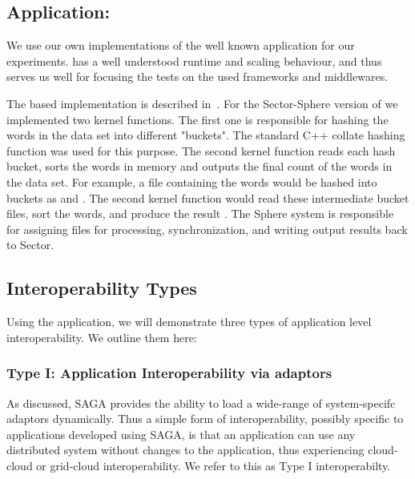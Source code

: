 \documentclass[3p,twocolumn]{elsarticle}
\begin{document}
\subsection{Application: \Wc}
\label{ssec:app}

We use our own implementations of the well known \wc application for
our experiments.  \Wc has a well understood runtime and scaling
behaviour, and thus serves us well for focusing the tests on the used
frameworks and middlewares.

The \mr based \wc implementation is described in~\cite{saga_ccgrid09}.
For the Sector-Sphere version of \wc we implemented two kernel
functions. The first one is responsible for hashing the
words in the data set into different "buckets". The standard C++ 
collate hashing function was used for this purpose.  The second 
kernel function reads each hash bucket, sorts the words in memory 
and outputs the final count of the words in the data set.  For example, 
a file containing the words
 would be hashed into buckets as
 and .  The second kernel
function would read these intermediate bucket files, sort the words,
and produce the result .  The Sphere system is responsible for assigning files for
processing, synchronization, and writing output results back to
Sector.

\subsection{Interoperability Types}

Using the \wc application, we will demonstrate three types of
application level interoperability. We outline them here:


\subsubsection{Type I: Application Interoperability via adaptors}
%
%

As discussed, SAGA provides the ability to load a wide-range of
system-specifc adaptors dynamically. Thus a simple form of
interoperability, possibly specific to applications developed using
SAGA, is that an application can use any distributed system without
changes to the application, thus experiencing cloud-cloud or
grid-cloud interoperability.  We refer to this as Type I
interoperabilty.
\end{document}
